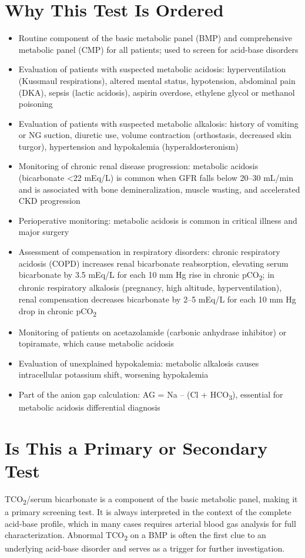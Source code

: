 \section*{Why This Test Is Ordered}
\begin{itemize}
  \item Routine component of the basic metabolic panel (BMP) and comprehensive metabolic panel (CMP) for all patients; used to screen for acid-base disorders
  \item Evaluation of patients with suspected metabolic acidosis: hyperventilation (Kussmaul respirations), altered mental status, hypotension, abdominal pain (DKA), sepsis (lactic acidosis), aspirin overdose, ethylene glycol or methanol poisoning
  \item Evaluation of patients with suspected metabolic alkalosis: history of vomiting or NG suction, diuretic use, volume contraction (orthostasis, decreased skin turgor), hypertension and hypokalemia (hyperaldosteronism)
  \item Monitoring of chronic renal disease progression: metabolic acidosis (bicarbonate <22 mEq/L) is common when GFR falls below 20--30 mL/min and is associated with bone demineralization, muscle wasting, and accelerated CKD progression
  \item Perioperative monitoring: metabolic acidosis is common in critical illness and major surgery
  \item Assessment of compensation in respiratory disorders: chronic respiratory acidosis (COPD) increases renal bicarbonate reabsorption, elevating serum bicarbonate by 3.5 mEq/L for each 10 mm Hg rise in chronic pCO\textsubscript{2}; in chronic respiratory alkalosis (pregnancy, high altitude, hyperventilation), renal compensation decreases bicarbonate by 2--5 mEq/L for each 10 mm Hg drop in chronic pCO\textsubscript{2}
  \item Monitoring of patients on acetazolamide (carbonic anhydrase inhibitor) or topiramate, which cause metabolic acidosis
  \item Evaluation of unexplained hypokalemia: metabolic alkalosis causes intracellular potassium shift, worsening hypokalemia
  \item Part of the anion gap calculation: AG = Na -- (Cl + HCO\textsubscript{3}), essential for metabolic acidosis differential diagnosis
\end{itemize}

\section*{Is This a Primary or Secondary Test}
TCO\textsubscript{2}/serum bicarbonate is a component of the basic metabolic panel, making it a primary screening test. It is always interpreted in the context of the complete acid-base profile, which in many cases requires arterial blood gas analysis for full characterization. Abnormal TCO\textsubscript{2} on a BMP is often the first clue to an underlying acid-base disorder and serves as a trigger for further investigation.

